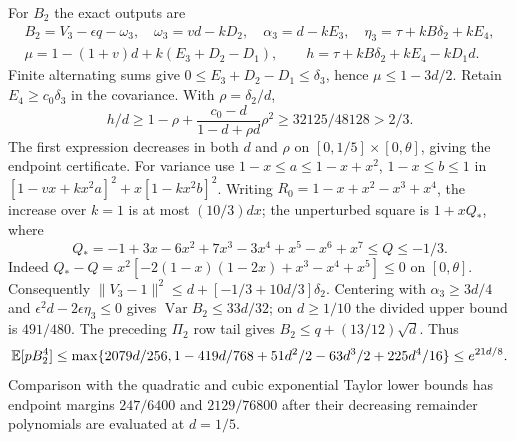 For $B_2$ the exact outputs are
\begin{gather*}
 B_2=V_3-\epsilon q-\omega_3,\quad\omega_3=vd-kD_2,\quad
 \alpha_3=d-kE_3,\quad\eta_3=\tau+kB\delta_{2}+kE_4,\\
 \mu=1-(1+v)d+k(E_3+D_2-D_1),\qquad
 h=\tau+kB\delta_{2}+kE_4-kD_1d.
\end{gather*}
Finite alternating sums give $0\le E_3+D_2-D_1\le \delta_{3}$, hence
$\mu\le1-3d/2$.
Retain $E_4\ge c_0\delta_{3}$ in the covariance. With $\rho=\delta_{2}/d$,
\[
 h/d\ge1-\rho+\frac{c_0-d}{1-d+\rho d}\rho^2
 \ge32125/48128>2/3.
\]
The first expression decreases in both $d$ and $\rho$ on
$[0,1/5]\times[0,\theta]$, giving the endpoint certificate.
For variance use $1-x\le a\le1-x+x^2$, $1-x\le b\le1$ in
$[1-vx+kx^2a]^2+x[1-kx^2b]^2$.
Writing $R_0=1-x+x^2-x^3+x^4$, the increase over $k=1$ is at most
$(10/3)dx$; the unperturbed square is $1+xQ_*$, where
\[
 Q_*=-1+3x-6x^2+7x^3-3x^4+x^5-x^6+x^7\le Q\le-1/3.
\]
Indeed $Q_*-Q=x^2[-2(1-x)(1-2x)+x^3-x^4+x^5]\le0$ on $[0,\theta]$.
Consequently $\|V_3-1\|^2\le d+[-1/3+10d/3]\delta_{2}$.
Centering with $\alpha_3\ge3d/4$ and
$\epsilon^2d-2\epsilon\eta_3\le0$ gives
$\operatorname{Var}B_2\le33d/32$; on $d\ge1/10$ the divided upper bound
is $491/480$.
The preceding $\Pi_2$ row tail gives $B_2\le q+(13/12)\sqrt d$.
Thus
\[
 \mathbb E[pB_2^4]\le\max\{2079d/256,
 1-419d/768+51d^2/2-63d^3/2+225d^4/16\}\le e^{21d/8}.
\]
Comparison with the quadratic and cubic exponential Taylor lower bounds
has endpoint margins $247/6400$ and
$2129/76800$ after their decreasing remainder polynomials are evaluated
at $d=1/5$.

